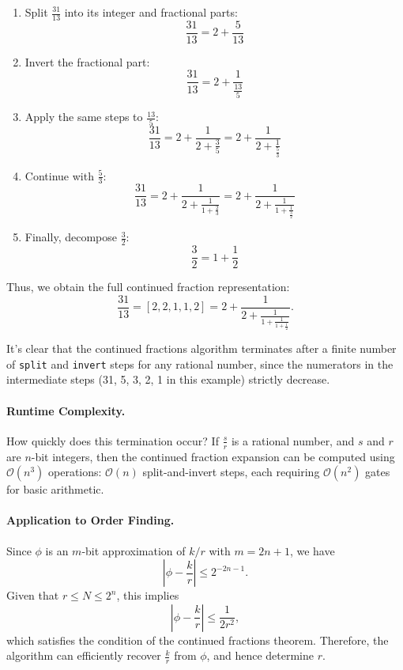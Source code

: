\begin{enumerate}
    \item Split $\frac{31}{13}$ into its integer and fractional parts:
    \[
    \frac{31}{13} = 2 + \frac{5}{13}
    \]
    \item Invert the fractional part:
    \[
    \frac{31}{13} = 2 + \frac{1}{\frac{13}{5}}
    \]
    \item Apply the same steps to $\frac{13}{5}$:
    \[
    \frac{31}{13} = 2 + \frac{1}{2 + \frac{3}{5}} = 2 + \frac{1}{2 + \frac{1}{\frac{5}{3}}}
    \]
    \item Continue with $\frac{5}{3}$:
    \[
    \frac{31}{13} = 2 + \frac{1}{2 + \frac{1}{1 + \frac{2}{3}}} = 2 + \frac{1}{2 + \frac{1}{1 + \frac{1}{\frac{3}{2}}}}
    \]
    \item Finally, decompose $\frac{3}{2}$:
    \[
    \frac{3}{2} = 1 + \frac{1}{2}
    \]
\end{enumerate}

Thus, we obtain the full continued fraction representation:
\[
\frac{31}{13} = [2, 2, 1, 1, 2] = 2 + \frac{1}{2 + \frac{1}{1 + \frac{1}{1 + \frac{1}{2}}}}.
\]

It's clear that the continued fractions algorithm terminates after a finite number of \texttt{split} and \texttt{invert} steps for any rational number, since the numerators in the intermediate steps (31, 5, 3, 2, 1 in this example) strictly decrease.

\paragraph{Runtime Complexity.}  
How quickly does this termination occur? If $\frac{s}{r}$ is a rational number, and $s$ and $r$ are $n$-bit integers, then the continued fraction expansion can be computed using $\mathcal{O}(n^3)$ operations: $\mathcal{O}(n)$ split-and-invert steps, each requiring $\mathcal{O}(n^2)$ gates for basic arithmetic.

\paragraph{Application to Order Finding.}  
Since $\phi$ is an $m$-bit approximation of $k/r$ with $m = 2n+1$, we have
\[
\left| \phi - \frac{k}{r} \right| \leq 2^{-2n - 1}.
\]
Given that $r \leq N \leq 2^n$, this implies
\[
\left| \phi - \frac{k}{r} \right| \leq \frac{1}{2r^2},
\]
which satisfies the condition of the continued fractions theorem. Therefore, the algorithm can efficiently recover $\frac{k}{r}$ from $\phi$, and hence determine $r$.

